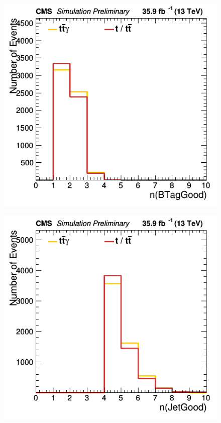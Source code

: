\documentclass[11pt]{scrartcl}
\begin{document}
	\begin{figure}[H]
	\centering
	\begin{minipage}{.5\textwidth}
	  \centering
	  \includegraphics[width=0.75\linewidth]{figures/Select1/nBTagGood.png}
	  \label{fig:nBTagGood}
	\end{minipage}%
	\begin{minipage}{.5\textwidth}
	  \centering
	  \includegraphics[width=0.75\linewidth]{figures/Select1/nJetGood.png}
	  \label{fig:nJetGood}
	\end{minipage}
	\end{figure}
	
\end{document}
